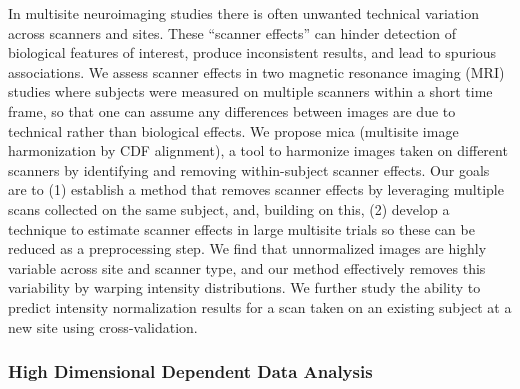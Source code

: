 \begin{itemize}
In multisite neuroimaging studies there is often unwanted technical variation across scanners and sites. These “scanner effects” can hinder detection of biological features of interest, produce inconsistent results, and lead to spurious associations. We assess scanner effects in two magnetic resonance imaging (MRI) studies where subjects were measured on multiple scanners within a short time frame, so that one can assume any differences between images are due to technical rather than biological effects. We propose mica (multisite image harmonization by CDF alignment), a tool to harmonize images taken on different scanners by identifying and removing within-subject scanner effects. Our goals are to (1) establish a method that removes scanner effects by leveraging multiple scans collected on the same subject, and, building on this, (2) develop a technique to estimate scanner effects in large multisite trials so these can be reduced as a preprocessing step. We find that unnormalized images are highly variable across site and scanner type, and our method effectively removes this variability by warping intensity distributions. We further study the ability to predict intensity normalization results for a scan taken on an existing subject at a new site using cross-validation.

\end{itemize}

\subsubsection*{High Dimensional Dependent Data Analysis}

